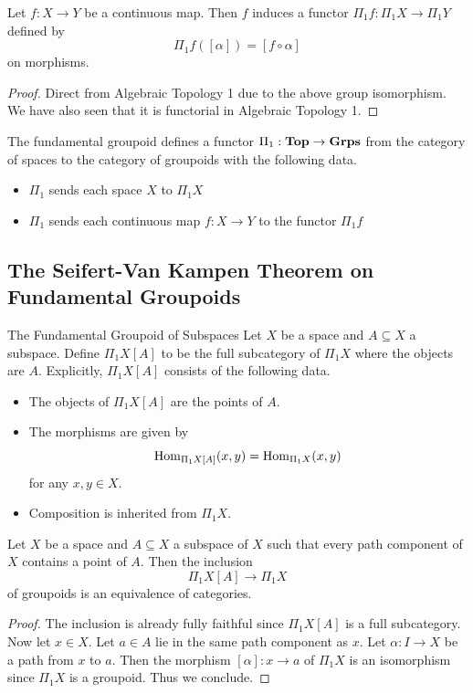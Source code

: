 \documentclass[a4paper]{article}
\begin{document}
\begin{prp}{}{} Let $f:X\to Y$ be a continuous map. Then $f$ induces a functor $\Pi_1f:\Pi_1X\to\Pi_1Y$ defined by $$\Pi_1f([\alpha])=[f\circ\alpha]$$ on morphisms. \tcbline
\begin{proof}
Direct from Algebraic Topology 1 due to the above group isomorphism. We have also seen that it is functorial in Algebraic Topology 1. 
\end{proof}
\end{prp}

\begin{thm}{}{} The fundamental groupoid defines a functor $\Pi_1:\bold{Top}\to\bold{Grps}$ from the category of spaces to the category of groupoids with the following data. 
\begin{itemize}
\item $\Pi_1$ sends each space $X$ to $\Pi_1X$
\item $\Pi_1$ sends each continuous map $f:X\to Y$ to the functor $\Pi_1f$
\end{itemize}
\end{thm}

\subsection{The Seifert-Van Kampen Theorem on Fundamental Groupoids}
\begin{defn}{The Fundamental Groupoid of Subspaces}{} Let $X$ be a space and $A\subseteq X$ a subspace. Define $\Pi_1X[A]$ to be the full subcategory of $\Pi_1X$ where the objects are $A$. Explicitly, $\Pi_1X[A]$ consists of the following data. 
\begin{itemize}
\item The objects of $\Pi_1X[A]$ are the points of $A$. 
\item The morphisms are given by $$\operatorname{Hom}_{\Pi_1X[A]}(x,y)=\operatorname{Hom}_{\Pi_1X}(x,y)$$ for any $x,y\in X$. 
\item Composition is inherited from $\Pi_1X$. 
\end{itemize}
\end{defn}

\begin{lmm}{}{} Let $X$ be a space and $A\subseteq X$ a subspace of $X$ such that every path component of $X$ contains a point of $A$. Then the inclusion $$\Pi_1X[A]\to\Pi_1X$$ of groupoids is an equivalence of categories. \tcbline
\begin{proof}
The inclusion is already fully faithful since $\Pi_1X[A]$ is a full subcategory. Now let $x\in X$. Let $a\in A$ lie in the same path component as $x$. Let $\alpha:I\to X$ be a path from $x$ to $a$. Then the morphism $[\alpha]:x\to a$ of $\Pi_1X$ is an isomorphism since $\Pi_1X$ is a groupoid. Thus we conclude. 
\end{proof}
\end{lmm}
\end{document}
